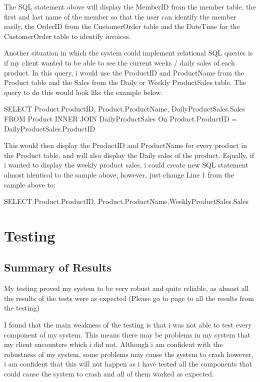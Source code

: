 The SQL statement above will display the MemberID from the member table, the first and last name of the member so that the user can identify the member easily, the OrderID from the CustomerOrder table and the DateTime for the CustomerOrder table to identify invoices.

Another situation in which the system could implement relational SQL queries is if my client wanted to be able to see the current weeks / daily sales of each product. In this query, i would use the ProductID and ProductName from the Product table and the Sales from the Daily or Weekly ProductSales table. The query to do this would look like the example below.
\begin{sql}
SELECT Product.ProductID, Product.ProductName, DailyProductSales.Sales
FROM Product
INNER JOIN DailyProductSales
On Product.ProductID = DailyProductSales.ProductID
\end{sql}

This would then display the ProductID and ProductName for every product in the Product table, and will also display the Daily sales of the product. Equally, if i wanted to display the weekly product sales, i could create new SQL statement almost identical to the sample above, however, just change Line 1 from the sample above to:

\begin{sql}
SELECT Product.ProductID, Product.ProductName,WeeklyProductSales.Sales
\end{sql}

\pagebreak 

\section{Testing}

\subsection{Summary of Results}

My testing proved my system to be very robust and quite reliable, as almost all the results of the tests were as expected (Please go to page \pageref{fig:actual-results} to all the results from the testing)

I found that the main weakness of the testing is that i was not able to test every component of my system. This means there may be problems in my system that my client encounters which i did not. Although i am confident with the robustness of my system, some problems may cause the system to crash however, i am confident that this will not happen as i have tested all the components that could cause the system to crash and all of them worked as expected.

